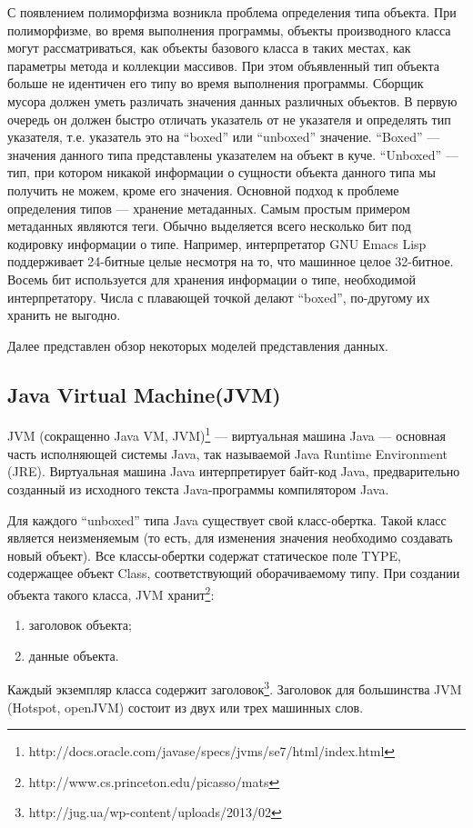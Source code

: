 С появлением полиморфизма возникла проблема определения типа объекта. При полиморфизме, во время выполнения программы,
объекты производного класса могут рассматриваться,
как объекты базового класса в таких местах, как параметры метода и коллекции
массивов. При этом объявленный тип объекта больше не идентичен его типу во время выполнения программы.
Сборщик мусора должен уметь различать значения данных различных объектов.
В первую очередь он должен быстро отличать указатель от не указателя и определять тип указателя,
т.е. указатель это на ``boxed''  или ``unboxed''  значение.
``Boxed'' — значения данного типа представлены указателем на объект в куче. 
``Unboxed''  — тип, при котором никакой информации о сущности объекта данного типа мы получить не можем, кроме его значения.
Основной подход к проблеме определения типов — хранение метаданных.
Самым простым примером метаданных являются теги.
Обычно выделяется всего несколько бит под кодировку информации о типе.
Например, интерпретатор
GNU Еmacs Lisp поддерживает 24-битные целые несмотря на то,
что машинное целое 32-битное.
Восемь бит используется для хранения информации о типе, необходимой интерпретатору.
Числа с плавающей точкой делают ``boxed'', по-другому их хранить не выгодно.

Далее представлен обзор некоторых моделей представления данных.

\subsection {Java Virtual Machine(JVM)}
JVM (сокращенно Java VM, JVM)\footnote{http://docs.oracle.com/javase/specs/jvms/se7/html/index.html} —
виртуальная машина Java 
— основная часть исполняющей системы Java,
так называемой Java Runtime Environment (JRE).
Виртуальная машина Java интерпретирует байт-код Java,
предварительно созданный из исходного текста Java-программы
компилятором Java.

Для каждого ``unboxed'' типа Java существует свой класс-обертка.
Такой класс является неизменяемым (то есть, для
изменения значения необходимо создавать новый объект).
Все классы-обертки содержат статическое поле TYPE, содержащее объект
Class, соответствующий оборачиваемому типу.
При создании объекта такого класса, JVM хранит\footnote{http://www.cs.princeton.edu/picasso/mats}:
\begin{enumerate}
\item[1)]заголовок объекта;
\item[2)]данные объекта.
\end{enumerate}
Каждый экземпляр класса содержит заголовок\footnote{http://jug.ua/wp-content/uploads/2013/02}. Заголовок для 
большинства JVM (Hotspot, openJVM) состоит из двух или трех машинных слов.

